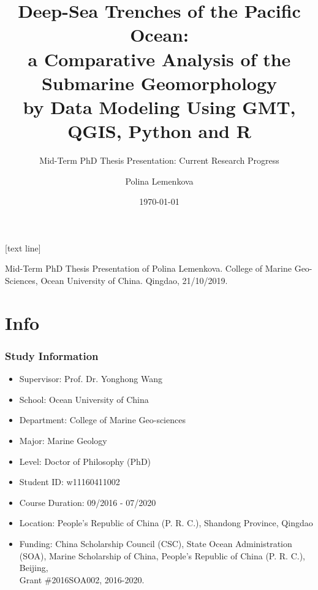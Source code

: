 \documentclass[pdflatex,compress,8pt,
	xcolor={dvipsnames,dvipsnames,svgnames,x11names,table},
	hyperref={colorlinks = true,breaklinks = true, urlcolor = NavyBlue, breaklinks = true}]{beamer}
\title{Deep-Sea Trenches of the Pacific Ocean:\\
a Comparative Analysis of the Submarine Geomorphology \\
by Data Modeling Using GMT, QGIS, Python and R}
\subtitle{Mid-Term PhD Thesis Presentation: Current Research Progress}
\author{Polina Lemenkova}
\institute{Ocean University of China, College of Marine Geo-Sciences}
\date{\today}
\begin{document}
\maketitle
[text line]{%
\parbox{\linewidth}{\vspace*{-8pt}Mid-Term PhD Thesis Presentation of Polina Lemenkova. College of Marine Geo-Sciences, Ocean University of China. Qingdao, 21/10/2019.} \hfill\insertpagenumber}


\section{Info}
 \begin{frame}\frametitle{Study Information}
\begin{itemize}
        	\item Supervisor: Prof. Dr. Yonghong Wang
	\item School: Ocean University of China
	\item Department: College of Marine Geo-sciences
	\item Major: Marine Geology
	\item Level: Doctor of Philosophy (PhD)
	\item Student ID: w11160411002
	\item Course Duration: 09/2016 - 07/2020
	\item Location: People's Republic of China (P. R. C.), Shandong Province, Qingdao
	\item Funding: China Scholarship Council (CSC), State Ocean Administration (SOA), Marine Scholarship of China, 
	People's Republic of China (P. R. C.), Beijing, \\
	Grant \#2016SOA002, 2016-2020.		
\end{itemize}
\end{frame}
\end{document}

